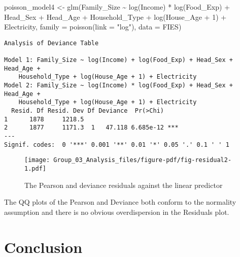 \documentclass[
]{article}
\newenvironment{Shaded}{\begin{snugshade}}{\end{snugshade}}
\newcommand{\AttributeTok}[1]{\textcolor[rgb]{0.40,0.45,0.13}{#1}}
\newcommand{\DecValTok}[1]{\textcolor[rgb]{0.68,0.00,0.00}{#1}}
\newcommand{\FunctionTok}[1]{\textcolor[rgb]{0.28,0.35,0.67}{#1}}
\newcommand{\NormalTok}[1]{\textcolor[rgb]{0.00,0.23,0.31}{#1}}
\newcommand{\OtherTok}[1]{\textcolor[rgb]{0.00,0.23,0.31}{#1}}
\newcommand{\SpecialCharTok}[1]{\textcolor[rgb]{0.37,0.37,0.37}{#1}}
\newcommand{\StringTok}[1]{\textcolor[rgb]{0.13,0.47,0.30}{#1}}
\begin{document}
\begin{Shaded}
\begin{Highlighting}[]
\NormalTok{poisson\_model4 }\OtherTok{\textless{}{-}} \FunctionTok{glm}\NormalTok{(Family\_Size }\SpecialCharTok{\textasciitilde{}} 
                      \FunctionTok{log}\NormalTok{(Income) }\SpecialCharTok{*} \FunctionTok{log}\NormalTok{(Food\_Exp) }\SpecialCharTok{+}
\NormalTok{                      Head\_Sex }\SpecialCharTok{+} 
\NormalTok{                      Head\_Age }\SpecialCharTok{+} 
\NormalTok{                      Household\_Type }\SpecialCharTok{+}
                      \FunctionTok{log}\NormalTok{(House\_Age }\SpecialCharTok{+} \DecValTok{1}\NormalTok{) }\SpecialCharTok{+}
\NormalTok{                      Electricity, }
                      \AttributeTok{family =} \FunctionTok{poisson}\NormalTok{(}\AttributeTok{link =} \StringTok{"log"}\NormalTok{),}
                      \AttributeTok{data =}\NormalTok{ FIES)}
\end{Highlighting}
\end{Shaded}

\begin{verbatim}
Analysis of Deviance Table

Model 1: Family_Size ~ log(Income) + log(Food_Exp) + Head_Sex + Head_Age + 
    Household_Type + log(House_Age + 1) + Electricity
Model 2: Family_Size ~ log(Income) * log(Food_Exp) + Head_Sex + Head_Age + 
    Household_Type + log(House_Age + 1) + Electricity
  Resid. Df Resid. Dev Df Deviance  Pr(>Chi)    
1      1878     1218.5                          
2      1877     1171.3  1   47.118 6.685e-12 ***
---
Signif. codes:  0 '***' 0.001 '**' 0.01 '*' 0.05 '.' 0.1 ' ' 1
\end{verbatim}

\begin{figure}[H]

{\centering \texttt{[image: Group\_03\_Analysis\_files/figure-pdf/fig-residual2-1.pdf]}

}

\caption{\label{fig-residual2}The Pearson and deviance residuals against
the linear predictor}

\end{figure}

The QQ plots of the Pearson and Deviance both conform to the normality
assumption and there is no obvious overdispersion in the Residuals plot.

\hypertarget{conclusion}{%
\section{Conclusion}\label{conclusion}}
\end{document}
